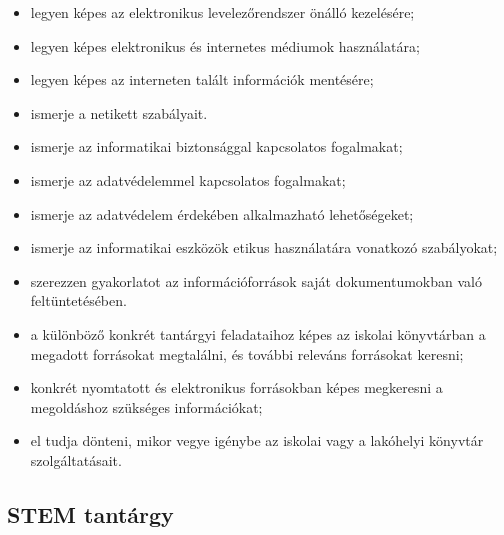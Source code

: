 \begin{itemize}
\item legyen képes az elektronikus levelezőrendszer önálló kezelésére;
\item legyen képes elektronikus és internetes médiumok használatára;
\item legyen képes az interneten talált információk mentésére;
\item ismerje a netikett szabályait.
\item ismerje az informatikai biztonsággal kapcsolatos fogalmakat;
\item ismerje az adatvédelemmel kapcsolatos fogalmakat;
\item ismerje az adatvédelem érdekében alkalmazható lehetőségeket;
\item ismerje az informatikai eszközök etikus használatára vonatkozó szabályokat;
\item szerezzen gyakorlatot az információforrások saját dokumentumokban való feltüntetésében.
\item a különböző konkrét tantárgyi feladataihoz képes az iskolai könyvtárban a megadott forrásokat megtalálni, és további releváns forrásokat keresni;
\item konkrét nyomtatott és elektronikus forrásokban képes megkeresni a megoldáshoz szükséges információkat;
\item el tudja dönteni, mikor vegye igénybe az iskolai vagy a lakóhelyi könyvtár szolgáltatásait.
\end{itemize}
\subsection{STEM tantárgy}
